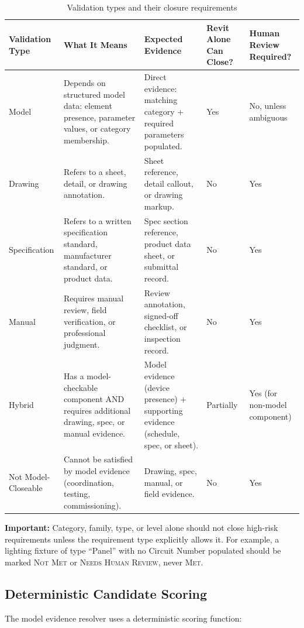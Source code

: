 \documentclass[10pt,letterpaper]{article}
\newcommand{\strong}[1]{\textbf{\textcolor{emaNavy}{#1}}}
\newcommand{\guardrailbox}[1]{%
\begin{tcolorbox}[colback=guardrailBlue,colframe=guardrailBorder,
    boxrule=0.6pt,arc=2mm,left=10pt,right=10pt,top=8pt,bottom=8pt]\small #1%
\end{tcolorbox}}
\begin{document}
\begin{longtable}{p{1.0in}p{1.5in}p{1.5in}p{1.2in}p{1.2in}}
\caption{Validation types and their closure requirements}
\label{tab:validation-types}\\
\toprule
\textbf{Validation Type} & \textbf{What It Means} & \textbf{Expected Evidence} & \textbf{Revit Alone Can Close?} & \textbf{Human Review Required?} \\
\midrule
\endhead
Model & Depends on structured model data: element presence, parameter values, or category
  membership. & Direct evidence: matching category + required parameters populated. & Yes &
  No, unless ambiguous \\
Drawing & Refers to a sheet, detail, or drawing annotation. & Sheet reference, detail callout,
  or drawing markup. & No & Yes \\
Specification & Refers to a written specification standard, manufacturer standard, or product data.
  & Spec section reference, product data sheet, or submittal record. & No & Yes \\
Manual & Requires manual review, field verification, or professional judgment. & Review annotation,
  signed-off checklist, or inspection record. & No & Yes \\
Hybrid & Has a model-checkable component AND requires additional drawing, spec, or manual evidence.
  & Model evidence (device presence) + supporting evidence (schedule, spec, or sheet). & Partially
  & Yes (for non-model component) \\
Not Model-Closeable & Cannot be satisfied by model evidence (coordination, testing, commissioning).
  & Drawing, spec, manual, or field evidence. & No & Yes \\
\bottomrule
\end{longtable}

\guardrailbox{\strong{Important:} Category, family, type, or level alone should not close high-risk
  requirements unless the requirement type explicitly allows it. For example, a lighting fixture of
  type ``Panel'' with no Circuit Number populated should be marked \textsc{Not Met} or
  \textsc{Needs Human Review}, never \textsc{Met}.}

\subsection{Deterministic Candidate Scoring}

The model evidence resolver uses a deterministic scoring function:
\end{document}
